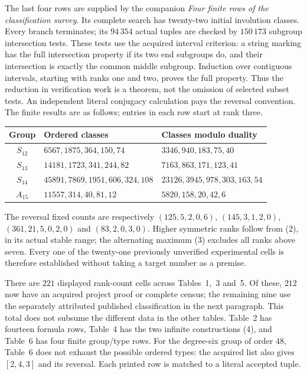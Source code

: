 \documentclass[11pt]{article}
\begin{document}
The last four rows are supplied by the companion \emph{Four finite rows
of the classification survey}. Its complete search has twenty-two initial
involution classes. Every branch terminates; its $94\,354$ actual tuples
are checked by $150\,173$ subgroup intersection tests. These tests use the
acquired interval criterion: a string marking has the full intersection
property if its two end subgroups do, and their intersection is exactly
the common middle subgroup. Induction over contiguous intervals, starting
with ranks one and two, proves the full property. Thus the reduction in
verification work is a theorem, not the omission of selected subset tests.
An independent literal conjugacy calculation pays the reversal convention.
The finite results are as follows; entries in each row start at rank three.
\begin{center}
\begin{tabular}{@{}cll@{}}
\toprule Group & Ordered classes & Classes modulo duality\\\midrule
$S_{12}$ & $6567,1875,364,150,74$ & $3346,940,183,75,40$\\
$S_{13}$ & $14181,1723,341,244,82$ & $7163,863,171,123,41$\\
$S_{14}$ & $45891,7869,1951,606,324,108$ & $23126,3945,978,303,163,54$\\
$A_{15}$ & $11557,314,40,81,12$ & $5820,158,20,42,6$\\\bottomrule
\end{tabular}
\end{center}
The reversal fixed counts are respectively
$(125,5,2,0,6)$, $(145,3,1,2,0)$, $(361,21,5,0,2,0)$ and
$(83,2,0,3,0)$. Higher symmetric ranks follow from (2), in its actual
stable range; the alternating maximum (3) excludes all ranks above seven.
Every one of the twenty-one previously unverified experimental cells is
therefore established without taking a target number as a premise.

There are $221$ displayed rank-count cells across Tables~1,~3 and~5.
Of these, $212$ now have an acquired project proof or complete census;
the remaining nine use the separately attributed published classification
in the next paragraph. This total does not subsume the different data in
the other tables. Table~2 has fourteen formula rows, Table~4 has the two
infinite constructions (4), and Table~6 has four finite group/type rows.
For the degree-six group of order $48$, Table~6 does not exhaust the
possible ordered types: the acquired list also gives $[2,4,3]$ and its
reversal. Each printed row is matched to a literal accepted tuple.
\end{document}
